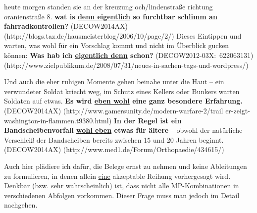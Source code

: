 \begin{exe}
	\ex\label{1199} 
		\begin{xlist}	
			\ex\label{1199a} 
			\scriptsize 
			{heute morgen standen sie an der kreuzung och/lindenstraße richtung oranienstraße 8. \textbf{wat is \underline{denn eigentlich} so furchtbar 				schlimm an fahrradkontrollen?}	
			\hfill\hbox {(DECOW2014AX)}			
			\newline
			\hbox{}\hfill\hbox {(http://blogs.taz.de/hausmeisterblog/2006/10/page/2/)}}
			\ex\label{1199b} 
			\scriptsize 
			{Dieses Eintippen und warten, was wohl für ein Vorschlag kommt und nicht im Überblick gucken können: \textbf{Was hab ich \underline{eigentlich 				denn} schon? }    
			\hfill\hbox {(DECOW2012-03X: 622063131)}}	
			\newline
			\hbox{}\hfill\hbox {(http://www.zielpublikum.de/2008/07/31/neues-in-sachen-tags-und-wordpress/)}
		\end{xlist}
\end{exe}
	           	
\begin{exe}
	\ex\label{1200} 
		\begin{xlist}
			\ex\label{1200a} 
			\scriptsize 
			{Und auch die eher ruhigen Momente gehen beinahe unter die Haut – ein verwundeter Soldat kriecht weg, im Schutz eines Kellers oder Bunkers 					warten Soldaten auf etwas. \textbf{Es wird \underline{eben wohl} eine ganz besondere Erfahrung.} 	
			\hfill\hbox {(DECOW2014AX)}			
			\newline
			\hbox{}\hfill\hbox {(http://www.gamersunity.de/modern-warfare-2/trail}	
			\newline
			\hbox{}\hfill\hbox {er-zeigt-washington-in-flammen.t9380.html)}}			
			\ex\label{1200b}
			\scriptsize  
			{\textbf{In der Regel ist ein Bandscheibenvorfall \underline{wohl eben} etwas für ältere} – obwohl der natürliche Verschleiß der Bandscheiben 				bereits zwischen 15 und 20 Jahren beginnt.    
			\hfill\hbox {(DECOW2014AX)}	
			\newline
			\hbox{}\hfill\hbox {(http://www.med1.de/Forum/Orthopaedie/434615/)}}
		\end{xlist}
\end{exe}				           	
Auch hier plädiere ich dafür, die Belege ernst zu nehmen und keine Ableitungen zu formulieren, in denen allein \underline{eine} akzeptable Reihung vorhergesagt wird. Denkbar (bzw. sehr wahrscheinlich) ist, dass nicht alle MP-Kombinationen in verschiedenen Abfolgen vorkommen. Dieser Frage muss man jedoch im Detail nachgehen.\\

